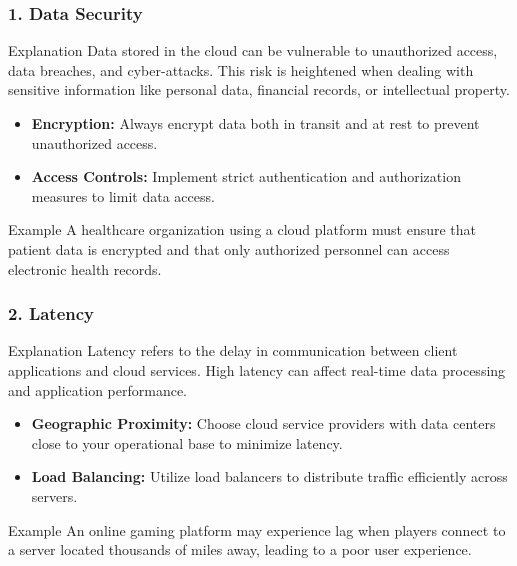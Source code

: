 \documentclass[aspectratio=169]{beamer}
\begin{document}
\begin{frame}[fragile]
    \frametitle{1. Data Security}
    \begin{block}{Explanation}
        Data stored in the cloud can be vulnerable to unauthorized access, data breaches, and cyber-attacks. This risk is heightened when dealing with sensitive information like personal data, financial records, or intellectual property.
    \end{block}

    \begin{itemize}
        \item \textbf{Encryption:} Always encrypt data both in transit and at rest to prevent unauthorized access.
        \item \textbf{Access Controls:} Implement strict authentication and authorization measures to limit data access.
    \end{itemize}

    \begin{block}{Example}
        A healthcare organization using a cloud platform must ensure that patient data is encrypted and that only authorized personnel can access electronic health records.
    \end{block}
\end{frame}

\begin{frame}[fragile]
    \frametitle{2. Latency}
    \begin{block}{Explanation}
        Latency refers to the delay in communication between client applications and cloud services. High latency can affect real-time data processing and application performance.
    \end{block}

    \begin{itemize}
        \item \textbf{Geographic Proximity:} Choose cloud service providers with data centers close to your operational base to minimize latency.
        \item \textbf{Load Balancing:} Utilize load balancers to distribute traffic efficiently across servers.
    \end{itemize}

    \begin{block}{Example}
        An online gaming platform may experience lag when players connect to a server located thousands of miles away, leading to a poor user experience.
    \end{block}
\end{frame}
\end{document}
